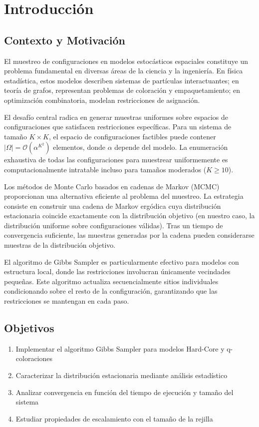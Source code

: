 
\section{Introducción}

\subsection{Contexto y Motivación}

El muestreo de configuraciones en modelos estocásticos espaciales constituye un problema fundamental en diversas áreas de la ciencia y la ingeniería. En física estadística, estos modelos describen sistemas de partículas interactuantes; en teoría de grafos, representan problemas de coloración y empaquetamiento; en optimización combinatoria, modelan restricciones de asignación.

El desafío central radica en generar muestras uniformes sobre espacios de configuraciones que satisfacen restricciones específicas. Para un sistema de tamaño $K \times K$, el espacio de configuraciones factibles puede contener $|\Omega| = \mathcal{O}(\alpha^{K^2})$ elementos, donde $\alpha$ depende del modelo. La enumeración exhaustiva de todas las configuraciones para muestrear uniformemente es computacionalmente intratable incluso para tamaños moderados ($K \geq 10$).

Los métodos de Monte Carlo basados en cadenas de Markov (MCMC) proporcionan una alternativa eficiente al problema del muestreo. La estrategia consiste en construir una cadena de Markov ergódica cuya distribución estacionaria coincide exactamente con la distribución objetivo (en nuestro caso, la distribución uniforme sobre configuraciones válidas). Tras un tiempo de convergencia suficiente, las muestras generadas por la cadena pueden considerarse muestras de la distribución objetivo.

El algoritmo de Gibbs Sampler es particularmente efectivo para modelos con estructura local, donde las restricciones involucran únicamente vecindades pequeñas. Este algoritmo actualiza secuencialmente sitios individuales condicionando sobre el resto de la configuración, garantizando que las restricciones se mantengan en cada paso.

\subsection{Objetivos}

\begin{enumerate}
    \item Implementar el algoritmo Gibbs Sampler para modelos Hard-Core y q-coloraciones
    \item Caracterizar la distribución estacionaria mediante análisis estadístico
    \item Analizar convergencia en función del tiempo de ejecución y tamaño del sistema
    \item Estudiar propiedades de escalamiento con el tamaño de la rejilla
\end{enumerate}

